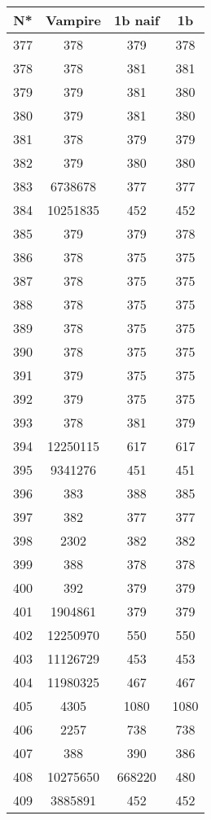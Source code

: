 \begin{table}[H]
\begin{tabular}{|c|c|c|c|}
\hline
N* & Vampire & 1b naif & 1b \\
\hline
377 & 378 & 379 & 378 \\
\hline
378 & 378 & 381 & 381 \\
\hline
379 & 379 & 381 & 380 \\
\hline
380 & 379 & 381 & 380 \\
\hline
381 & 378 & 379 & 379 \\
\hline
382 & 379 & 380 & 380 \\
\hline
383 & 6738678 & 377 & 377 \\
\hline
384 & 10251835 & 452 & 452 \\
\hline
385 & 379 & 379 & 378 \\
\hline
386 & 378 & 375 & 375 \\
\hline
387 & 378 & 375 & 375 \\
\hline
388 & 378 & 375 & 375 \\
\hline
389 & 378 & 375 & 375 \\
\hline
390 & 378 & 375 & 375 \\
\hline
391 & 379 & 375 & 375 \\
\hline
392 & 379 & 375 & 375 \\
\hline
393 & 378 & 381 & 379 \\
\hline
394 & 12250115 & 617 & 617 \\
\hline
395 & 9341276 & 451 & 451 \\
\hline
396 & 383 & 388 & 385 \\
\hline
397 & 382 & 377 & 377 \\
\hline
398 & 2302 & 382 & 382 \\
\hline
399 & 388 & 378 & 378 \\
\hline
400 & 392 & 379 & 379 \\
\hline
401 & 1904861 & 379 & 379 \\
\hline
402 & 12250970 & 550 & 550 \\
\hline
403 & 11126729 & 453 & 453 \\
\hline
404 & 11980325 & 467 & 467 \\
\hline
405 & 4305 & 1080 & 1080 \\
\hline
406 & 2257 & 738 & 738 \\
\hline
407 & 388 & 390 & 386 \\
\hline
408 & 10275650 & 668220 & 480 \\
\hline
409 & 3885891 & 452 & 452 \\

\end{tabular}
\end{table}
